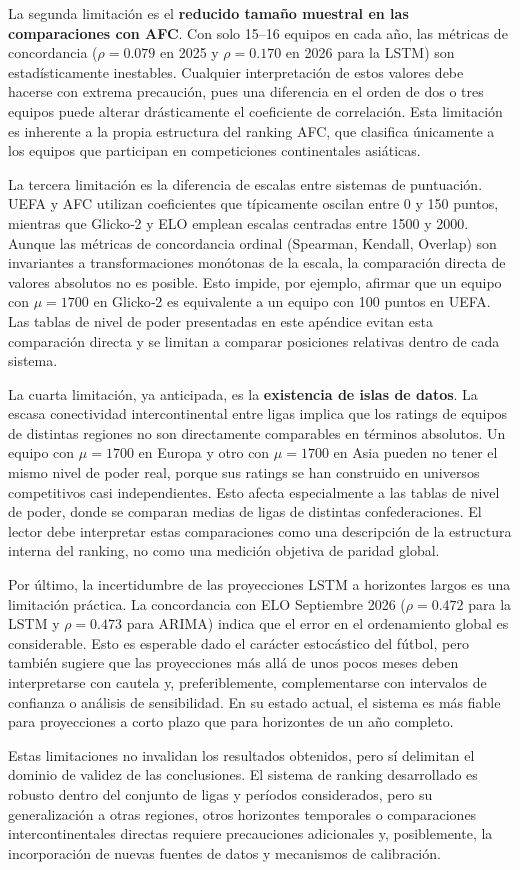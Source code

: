 La segunda limitaci\'on es el \textbf{reducido tama\~no muestral en las comparaciones con AFC}. Con solo 15--16 equipos en cada a\~no, las m\'etricas de concordancia ($\rho = 0.079$ en 2025 y $\rho = 0.170$ en 2026 para la LSTM) son estad\'isticamente inestables. Cualquier interpretaci\'on de estos valores debe hacerse con extrema precauci\'on, pues una diferencia en el orden de dos o tres equipos puede alterar dr\'asticamente el coeficiente de correlaci\'on. Esta limitaci\'on es inherente a la propia estructura del ranking AFC, que clasifica \'unicamente a los equipos que participan en competiciones continentales asi\'aticas.

La tercera limitaci\'on es la diferencia de escalas entre sistemas de puntuaci\'on. UEFA y AFC utilizan coeficientes que t\'ipicamente oscilan entre 0 y 150 puntos, mientras que Glicko‑2 y ELO emplean escalas centradas entre 1500 y 2000. Aunque las m\'etricas de concordancia ordinal (Spearman, Kendall, Overlap) son invariantes a transformaciones mon\'otonas de la escala, la comparaci\'on directa de valores absolutos no es posible. Esto impide, por ejemplo, afirmar que un equipo con \(\mu = 1700\) en Glicko‑2 es equivalente a un equipo con 100 puntos en UEFA. Las tablas de nivel de poder presentadas en este ap\'endice evitan esta comparaci\'on directa y se limitan a comparar posiciones relativas dentro de cada sistema.

La cuarta limitaci\'on, ya anticipada, es la \textbf{existencia de islas de datos}. La escasa conectividad intercontinental entre ligas implica que los ratings de equipos de distintas regiones no son directamente comparables en t\'erminos absolutos. Un equipo con \(\mu = 1700\) en Europa y otro con \(\mu = 1700\) en Asia pueden no tener el mismo nivel de poder real, porque sus ratings se han construido en universos competitivos casi independientes. Esto afecta especialmente a las tablas de nivel de poder, donde se comparan medias de ligas de distintas confederaciones. El lector debe interpretar estas comparaciones como una descripci\'on de la estructura interna del ranking, no como una medici\'on objetiva de paridad global.

Por \'ultimo, la incertidumbre de las proyecciones LSTM a horizontes largos es una limitaci\'on pr\'actica. La concordancia con ELO Septiembre 2026 ($\rho = 0.472$ para la LSTM y $\rho = 0.473$ para ARIMA) indica que el error en el ordenamiento global es considerable. Esto es esperable dado el car\'acter estoc\'astico del f\'utbol, pero tambi\'en sugiere que las proyecciones m\'as all\'a de unos pocos meses deben interpretarse con cautela y, preferiblemente, complementarse con intervalos de confianza o an\'alisis de sensibilidad. En su estado actual, el sistema es m\'as fiable para proyecciones a corto plazo que para horizontes de un a\~no completo.

Estas limitaciones no invalidan los resultados obtenidos, pero s\'i delimitan el dominio de validez de las conclusiones. El sistema de ranking desarrollado es robusto dentro del conjunto de ligas y per\'iodos considerados, pero su generalizaci\'on a otras regiones, otros horizontes temporales o comparaciones intercontinentales directas requiere precauciones adicionales y, posiblemente, la incorporaci\'on de nuevas fuentes de datos y mecanismos de calibraci\'on.